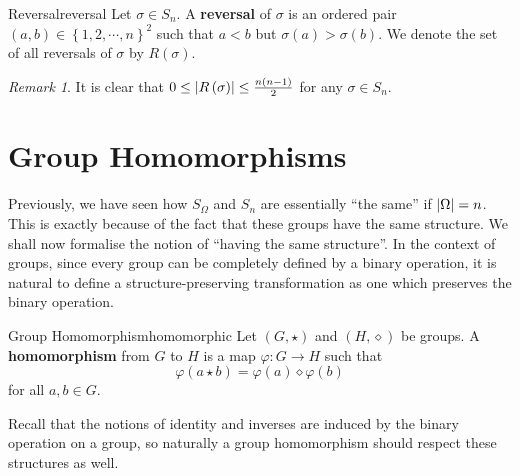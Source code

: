 \documentclass[math]{amznotes}
\theoremstyle{remark}
\newtheorem*{remark}{Remark}
\newcommand{\0}{\mathbf{0}}
\newcommand{\1}{\mathbf{1}}
\begin{document}
\begin{dfnbox}{Reversal}{reversal}
    Let $\sigma \in S_n$. A {\color{red} \textbf{reversal}} of $\sigma$ is an ordered pair $\left(a, b\right) \in \left\{1, 2, \cdots, n\right\}^2$ such that $a < b$ but $\sigma\left(a\right) > \sigma\left(b\right)$. We denote the set of all reversals of $\sigma$ by $R\left(\sigma\right)$.
\end{dfnbox}
\begin{notebox}
    \begin{remark}
        It is clear that $0 \leq {\left\lvert {R\left(\sigma\right)} \right\rvert} \leq \frac{n\left(n - 1\right)}{2}$ for any $\sigma \in S_n$.
    \end{remark}
\end{notebox}
\section{Group Homomorphisms}
Previously, we have seen how $S_{\Omega}$ and $S_n$ are essentially ``the same'' if ${\left\lvert {\Omega} \right\rvert} = n$. This is exactly because of the fact that these groups have the same structure. We shall now formalise the notion of ``having the same structure''. In the context of groups, since every group can be completely defined by a binary operation, it is natural to define a structure-preserving transformation as one which preserves the binary operation.
\begin{dfnbox}{Group Homomorphism}{homomorphic}
    Let $\left(G, \star\right)$ and $\left(H, \diamond\right)$ be groups. A {\color{red} \textbf{homomorphism}} from $G$ to $H$ is a map $\varphi \colon G \to H$ such that 
    \begin{equation*}
        \varphi\left(a \star b\right) = \varphi\left(a\right) \diamond \varphi\left(b\right)
    \end{equation*}
    for all $a, b \in G$.
\end{dfnbox}
Recall that the notions of identity and inverses are induced by the binary operation on a group, so naturally a group homomorphism should respect these structures as well.
\end{document}
